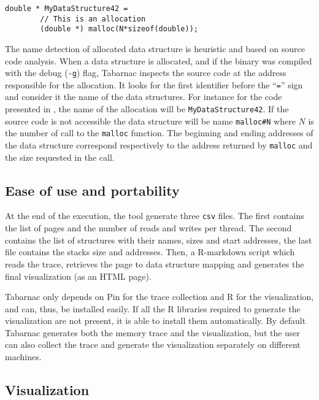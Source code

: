 \begin{lstlisting}[caption={A simple allocation.}, label=lst:alloc,float=htb]
    double * MyDataStructure42 =
        // This is an allocation
        (double *) malloc(N*sizeof(double));
\end{lstlisting}

The name detection of allocated data structure is heuristic and based on source code analysis.
When a data structure is allocated, and if the binary was compiled with the debug (\texttt{-g}) flag, \gls{Tabarnac} inspects the source code at the address responsible for the allocation.
It looks for the first identifier before the ``\texttt{=}'' sign and consider it the name of the data structures.
For instance for the code presented in , the name of the allocation will be \texttt{MyDataStructure42}.
If the source code is not accessible the data structure will be name \texttt{malloc\#N} where $N$ is the number of call to the \texttt{malloc} function.
The beginning and ending addresses of the data structure correspond respectively to the address returned by \texttt{malloc} and the size requested in the call.

\subsection{Ease of use and portability}

At the end of the execution, the tool generate three \texttt{csv} files.
The first contains the list of pages and the number of reads and writes per thread.
The second contains the list of structures with their names, sizes and start addresses, the last file contains the stacks size and addresses.
Then, a \gls{R-markdown} script which reads the trace, retrieves the page to data structure mapping and generates the final visualization (as an HTML page).

\gls{Tabarnac} only depends on \gls{Pin} for the trace collection and \gls{R} for the visualization, and can, thus, be installed easily.
If all the R libraries required to generate the visualization are not present, it is able to install them automatically.
By default \gls{Tabarnac} generates both the memory trace and the visualization, but the user can also collect the trace and generate the visualization separately on different machines.

\subsection{Visualization}

